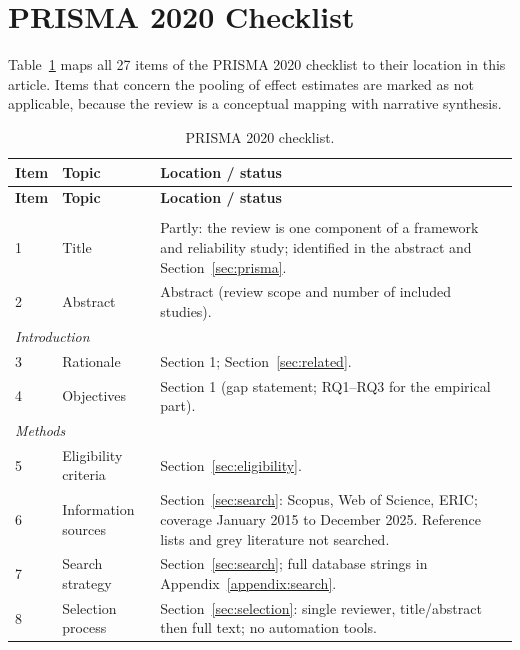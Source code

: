 \documentclass[journal,article,submit,pdftex,moreauthors]{Definitions/mdpi}
\begin{document}
\appendixstart
\appendix

\section[\appendixname~\thesection]{PRISMA 2020 Checklist}
\label{appendix:prisma}

Table~\ref{tab:prismachecklist} maps all 27 items of the PRISMA 2020 checklist \cite{page_prisma_2021} to their location in this article. Items that concern the pooling of effect estimates are marked as not applicable, because the review is a conceptual mapping with narrative synthesis.

{\scriptsize
\setlength{\tabcolsep}{3pt}
\begin{longtable}{p{0.7cm}p{3.0cm}p{8.3cm}}
\caption{PRISMA 2020 checklist.}
\label{tab:prismachecklist}\\
\toprule
\textbf{Item} & \textbf{Topic} & \textbf{Location / status} \\
\midrule
\endfirsthead
\toprule
\textbf{Item} & \textbf{Topic} & \textbf{Location / status} \\
\midrule
\endhead
\bottomrule
\endfoot
\multicolumn{3}{l}{\textit{Title and abstract}} \\
1 & Title & Partly: the review is one component of a framework and reliability study; identified in the abstract and Section~\ref{sec:prisma}. \\
2 & Abstract & Abstract (review scope and number of included studies). \\
\multicolumn{3}{l}{\textit{Introduction}} \\
3 & Rationale & Section 1; Section~\ref{sec:related}. \\
4 & Objectives & Section 1 (gap statement; RQ1--RQ3 for the empirical part). \\
\multicolumn{3}{l}{\textit{Methods}} \\
5 & Eligibility criteria & Section~\ref{sec:eligibility}. \\
6 & Information sources & Section~\ref{sec:search}: Scopus, Web of Science, ERIC; coverage January 2015 to December 2025. Reference lists and grey literature not searched. \\
7 & Search strategy & Section~\ref{sec:search}; full database strings in Appendix~\ref{appendix:search}. \\
8 & Selection process & Section~\ref{sec:selection}: single reviewer, title/abstract then full text; no automation tools. \\

\end{longtable}}
\end{document}
